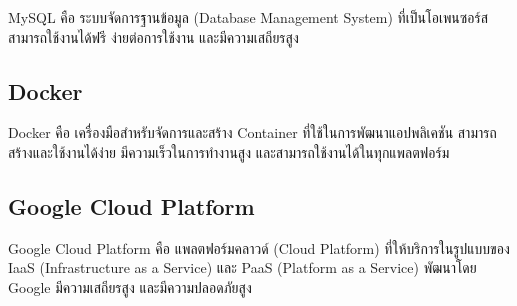 MySQL คือ ระบบจัดการฐานข้อมูล (Database Management System) ที่เป็นโอเพนซอร์ส สามารถใช้งานได้ฟรี ง่ายต่อการใช้งาน และมีความเสถียรสูง \cite{WhatIsMySQL}


\subsection{Docker}

Docker คือ เครื่องมือสำหรับจัดการและสร้าง Container ที่ใช้ในการพัฒนาแอปพลิเคชัน สามารถสร้างและใช้งานได้ง่าย มีความเร็วในการทำงานสูง และสามารถใช้งานได้ในทุกแพลตฟอร์ม \cite{WhatIsDocker}


\subsection{Google Cloud Platform}

Google Cloud Platform คือ แพลตฟอร์มคลาวด์ (Cloud Platform) ที่ให้บริการในรูปแบบของ IaaS (Infrastructure as a Service) และ PaaS (Platform as a Service) พัฒนาโดย Google มีความเสถียรสูง และมีความปลอดภัยสูง \cite{GCPNewbie}

